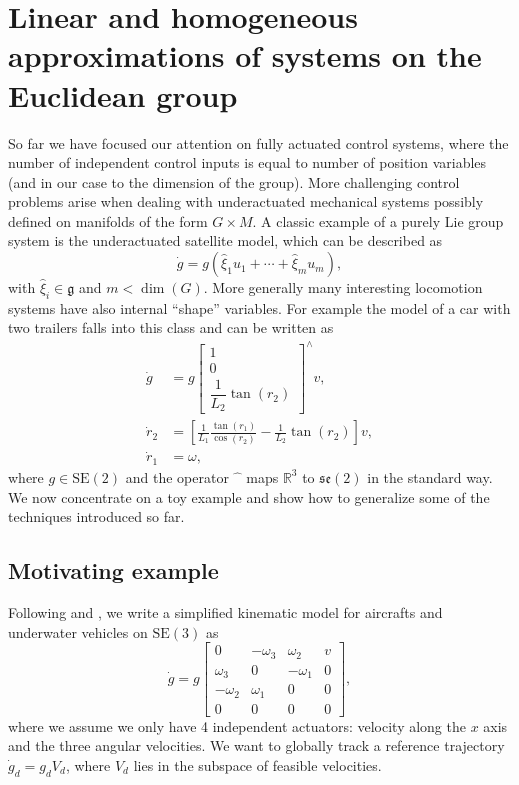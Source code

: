 \documentclass[11pt]{article}
\newcommand{\SE}{\mathrm{SE}}
\newcommand{\se}{\mathfrak{se}}
\newcommand{\gfrak}{\mathfrak g}
\newcommand{\R}{\mathbb R}
\begin{document}
\section{Linear and homogeneous approximations of systems on the Euclidean group}\label{sec:linear-homogeneous}
So far we have focused our attention on fully actuated control systems, where the number of independent control inputs is equal to number of position variables (and in our case to the dimension of the group). More challenging control problems arise when dealing with underactuated mechanical systems possibly defined on manifolds of the form $G\times M$. A classic example of a purely Lie group system is the underactuated satellite model, which can be described as
\begin{equation*}
\dot g=g(\widehat\xi_1u_1+\cdots+\widehat\xi_mu_m),
\end{equation*}
with $\widehat\xi_i\in\gfrak$ and $m<\dim(G)$. More generally many interesting locomotion systems have also internal ``shape'' variables. For example the model of a car with two trailers falls into this class and can be written as
\begin{align*}
\dot g &=g\begin{bmatrix}1\\0\\\dfrac{1}{L_2}\tan(r_2)\end{bmatrix}^{\!\wedge}v, \\
\dot r_2 &=\left[\frac1{L_1}\frac{\tan(r_1)}{\cos(r_2)}-\frac1{L_2}\tan(r_2)\right]v,\\
\dot r_1 &=\omega,
\end{align*}
where $g\in\SE(2)$ and the operator $\widehat{\phantom{x}}$ maps $\R^3$ to $\se(2)$ in the standard way. We now concentrate on a toy example and show how to generalize some of the techniques introduced so far.

\subsection{Motivating example}\label{subsec:motivating-example}
Following \cite{32} and \cite{27}, we write a simplified kinematic model for aircrafts and underwater vehicles on $\SE(3)$ as
\begin{equation*}
\dot g=g\begin{bmatrix}
0&-\omega_3&\omega_2&v\\
\omega_3&0&-\omega_1&0\\
-\omega_2&\omega_1&0&0\\
0&0&0&0
\end{bmatrix},
\end{equation*}
where we assume we only have 4 independent actuators: velocity along the $x$ axis and the three angular velocities. We want to globally track a reference trajectory $\dot g_d=g_dV_d$, where $V_d$ lies in the subspace of feasible velocities.
\end{document}
